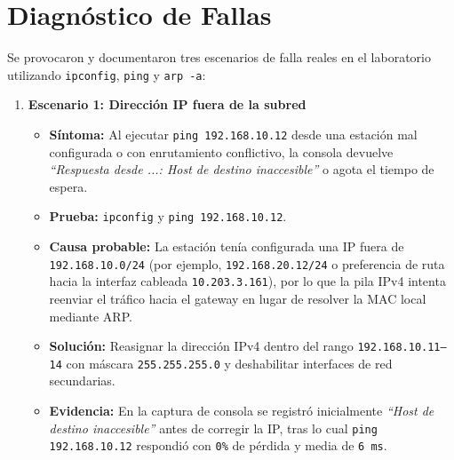 \documentclass[11pt, a4paper]{article}
\begin{document}
\section{Diagnóstico de Fallas}

Se provocaron y documentaron tres escenarios de falla reales en el laboratorio utilizando \texttt{ipconfig}, \texttt{ping} y \texttt{arp -a}:

\begin{enumerate}
    \item \textbf{Escenario 1: Dirección IP fuera de la subred}
    \begin{itemize}
        \item \textbf{Síntoma:} Al ejecutar \texttt{ping 192.168.10.12} desde una estación mal configurada o con enrutamiento conflictivo, la consola devuelve \textit{``Respuesta desde ...: Host de destino inaccesible''} o agota el tiempo de espera.
        \item \textbf{Prueba:} \texttt{ipconfig} y \texttt{ping 192.168.10.12}.
        \item \textbf{Causa probable:} La estación tenía configurada una IP fuera de \texttt{192.168.10.0/24} (por ejemplo, \texttt{192.168.20.12/24} o preferencia de ruta hacia la interfaz cableada \texttt{10.203.3.161}), por lo que la pila IPv4 intenta reenviar el tráfico hacia el gateway en lugar de resolver la MAC local mediante ARP.
        \item \textbf{Solución:} Reasignar la dirección IPv4 dentro del rango \texttt{192.168.10.11--14} con máscara \texttt{255.255.255.0} y deshabilitar interfaces de red secundarias.
        \item \textbf{Evidencia:} En la captura de consola se registró inicialmente \textit{``Host de destino inaccesible''} antes de corregir la IP, tras lo cual \texttt{ping 192.168.10.12} respondió con \texttt{0\%} de pérdida y media de \texttt{6 ms}.
    \end{itemize}


\end{enumerate}
\end{document}
